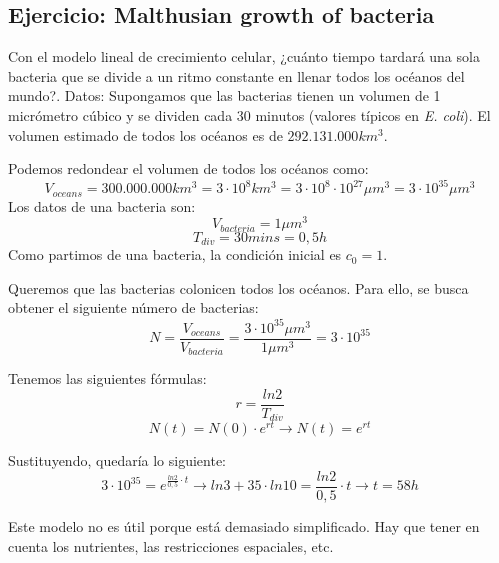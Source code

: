 \subsection{Ejercicio: Malthusian growth of bacteria}
Con el modelo lineal de crecimiento celular, ¿cuánto tiempo tardará una sola bacteria que se divide a un ritmo constante en llenar todos los océanos del mundo?. Datos: Supongamos que las bacterias tienen un volumen de 1 micrómetro cúbico y se dividen cada 30 minutos (valores típicos en \textit{E. coli}). El volumen estimado de todos los océanos es de $292.131.000 km^3$.

Podemos redondear el volumen de todos los océanos como:
$$V_{oceans} = 300.000.000 km^3 = 3 \cdot 10^8 km^3 = 3 \cdot 10^8 \cdot 10^{27} \mu m^3 = 3 \cdot 10^{35} \mu m^3$$
Los datos de una bacteria son:
$$V_{bacteria} = 1 \mu m^3$$
$$T_{div} = 30 mins = 0,5 h$$
Como partimos de una bacteria, la condición inicial es $c_0 = 1$.

Queremos que las bacterias colonicen todos los océanos. Para ello, se busca obtener el siguiente número de bacterias:
$$N = \frac{V_{oceans}}{V_{bacteria}} = \frac{3 \cdot 10^{35} \mu m^3}{1 \mu m^3} = 3 \cdot 10^{35}$$

Tenemos las siguientes fórmulas:
$$r = \frac{ln 2}{T_{div}} $$
$$N(t) = N(0) \cdot e^{rt} \rightarrow N(t) = e^{rt}$$

Sustituyendo, quedaría lo siguiente:
$$3 \cdot 10^{35} = e^{\frac{ln 2}{0,5} \cdot t} \rightarrow ln 3 + 35 \cdot ln 10 = \frac{ln 2}{0,5} \cdot t \rightarrow t = 58 h$$

Este modelo no es útil porque está demasiado simplificado. Hay que tener en cuenta los nutrientes, las restricciones espaciales, etc. 